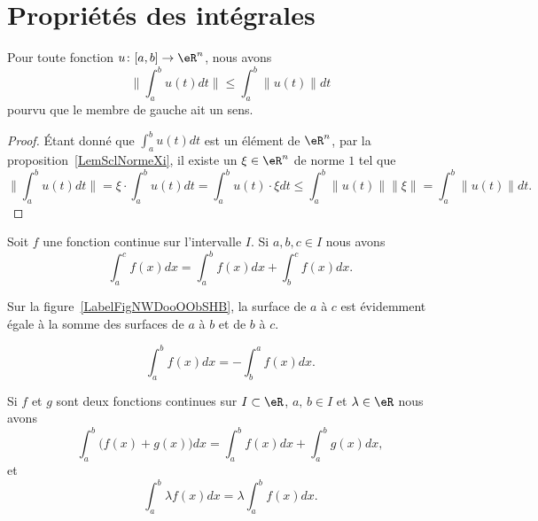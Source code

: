 \section{Propriétés des intégrales}

\begin{lemma}			\label{LemIneqnormeintintnorm}
	Pour toute fonction \( u\colon \mathopen[ a , b \mathclose]\to \eR^n\), nous avons
	\begin{equation}
		\| \int_a^bu(t)dt\|\leq\int_a^b\| u(t) \|dt
	\end{equation}
	pourvu que le membre de gauche ait un sens.
\end{lemma}

\begin{proof}
	Étant donné que \( \int_a^bu(t)dt\) est un élément de \( \eR^n\), par la proposition~\ref{LemSclNormeXi}, il existe un \( \xi\in\eR^n\) de norme \( 1\) tel que
	\begin{equation}
		\| \int_a^bu(t)dt \|=\xi\cdot\int_a^b u(t)dt=\int_a^b u(t)\cdot\xi dt\leq\int_a^b\| u(t) \|   \| \xi \|=\int_a^b\| u(t) \|dt.
	\end{equation}
\end{proof}

\begin{proposition}
	Soit  \( f\) une fonction continue sur l'intervalle \( I\). Si \( a,b,c\in I\) nous avons
	\begin{equation}
		\int_a^cf(x)dx=\int_a^bf(x)dx+\int_b^cf(x)dx.
	\end{equation}
\end{proposition}

Sur la figure~\ref{LabelFigNWDooOObSHB}, la surface de \( a\) à \( c\) est évidemment égale à la somme des surfaces de \( a\) à \( b\) et de \( b\) à \( c\).
\newcommand{\CaptionFigNWDooOObSHB}{Illustration pour les relations de Chasles.}


\begin{corollary}
	\begin{equation}
		\int_a^bf(x)dx=-\int_b^af(x)dx.
	\end{equation}
\end{corollary}

\begin{proposition}\label{lineariteintegrale}
	Si \( f\) et \( g\) sont deux fonctions continues sur \( I\subset\eR\), \( a, \, b\in I\) et \( \lambda\in \eR\) nous avons
	\begin{equation}
		\int_a^b\big( f(x)+g(x) \big)dx=\int_a^bf(x)dx+\int_a^bg(x)dx,
	\end{equation}
	et
	\begin{equation}
		\int_a^b \lambda f(x)dx=\lambda\int_a^bf(x)dx.
	\end{equation}
\end{proposition}

